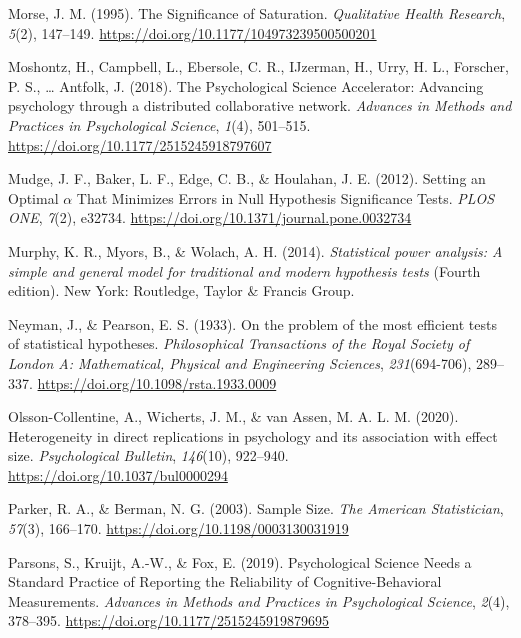 \documentclass[
  english,
  ,jou, a4paper,floatsintext]{apa6}
\newlength{\cslhangindent}
\newenvironment{cslreferences}%
  {\setlength{\parindent}{0pt}%
  \everypar{\setlength{\hangindent}{\cslhangindent}}\ignorespaces}%
  {\par}
\begin{document}
\begin{cslreferences}
\leavevmode\hypertarget{ref-morse_significance_1995}{}%
Morse, J. M. (1995). The Significance of Saturation. \emph{Qualitative Health Research}, \emph{5}(2), 147--149. \url{https://doi.org/10.1177/104973239500500201}

\leavevmode\hypertarget{ref-moshontz_psychological_2018}{}%
Moshontz, H., Campbell, L., Ebersole, C. R., IJzerman, H., Urry, H. L., Forscher, P. S., \ldots{} Antfolk, J. (2018). The Psychological Science Accelerator: Advancing psychology through a distributed collaborative network. \emph{Advances in Methods and Practices in Psychological Science}, \emph{1}(4), 501--515. \url{https://doi.org/10.1177/2515245918797607}

\leavevmode\hypertarget{ref-mudge_setting_2012}{}%
Mudge, J. F., Baker, L. F., Edge, C. B., \& Houlahan, J. E. (2012). Setting an Optimal \(\alpha\) That Minimizes Errors in Null Hypothesis Significance Tests. \emph{PLOS ONE}, \emph{7}(2), e32734. \url{https://doi.org/10.1371/journal.pone.0032734}

\leavevmode\hypertarget{ref-murphy_statistical_2014}{}%
Murphy, K. R., Myors, B., \& Wolach, A. H. (2014). \emph{Statistical power analysis: A simple and general model for traditional and modern hypothesis tests} (Fourth edition). New York: Routledge, Taylor \& Francis Group.

\leavevmode\hypertarget{ref-neyman_problem_1933}{}%
Neyman, J., \& Pearson, E. S. (1933). On the problem of the most efficient tests of statistical hypotheses. \emph{Philosophical Transactions of the Royal Society of London A: Mathematical, Physical and Engineering Sciences}, \emph{231}(694-706), 289--337. \url{https://doi.org/10.1098/rsta.1933.0009}

\leavevmode\hypertarget{ref-olsson-collentine_heterogeneity_2020}{}%
Olsson-Collentine, A., Wicherts, J. M., \& van Assen, M. A. L. M. (2020). Heterogeneity in direct replications in psychology and its association with effect size. \emph{Psychological Bulletin}, \emph{146}(10), 922--940. \url{https://doi.org/10.1037/bul0000294}

\leavevmode\hypertarget{ref-parker_sample_2003}{}%
Parker, R. A., \& Berman, N. G. (2003). Sample Size. \emph{The American Statistician}, \emph{57}(3), 166--170. \url{https://doi.org/10.1198/0003130031919}

\leavevmode\hypertarget{ref-parsons_psychological_2019}{}%
Parsons, S., Kruijt, A.-W., \& Fox, E. (2019). Psychological Science Needs a Standard Practice of Reporting the Reliability of Cognitive-Behavioral Measurements. \emph{Advances in Methods and Practices in Psychological Science}, \emph{2}(4), 378--395. \url{https://doi.org/10.1177/2515245919879695}


\end{cslreferences}
\end{document}

